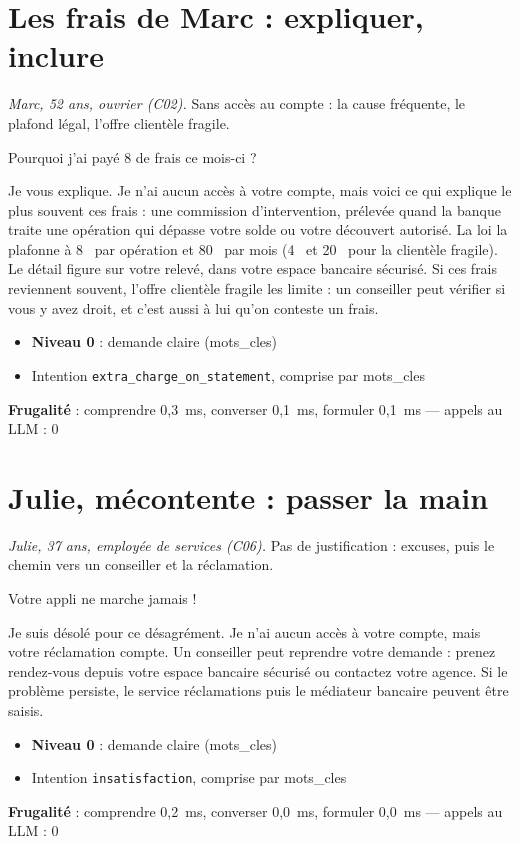 \documentclass[11pt,a4paper]{article}
\newcommand{\frugal}[1]{{\scriptsize\color{darkgray}\textbf{Frugalité} : #1}\par\medskip}
\begin{document}
\section{Les frais de Marc : expliquer, inclure}
\textit{Marc, 52 ans, ouvrier (C02).} Sans accès au compte : la cause fréquente, le plafond légal, l'offre clientèle fragile.

\begin{client}Pourquoi j'ai payé 8 \texteuro{} de frais ce mois-ci ?\end{client}
\begin{assistant}Je vous explique. Je n'ai aucun accès à votre compte, mais voici ce qui explique le plus souvent ces frais : une commission d'intervention, prélevée quand la banque traite une opération qui dépasse votre solde ou votre découvert autorisé. La loi la plafonne à 8~\texteuro{} par opération et 80~\texteuro{} par mois (4~\texteuro{} et 20~\texteuro{} pour la clientèle fragile). Le détail figure sur votre relevé, dans votre espace bancaire sécurisé. Si ces frais reviennent souvent, l'offre clientèle fragile les limite : un conseiller peut vérifier si vous y avez droit, et c'est aussi à lui qu'on conteste un frais.\end{assistant}
\begin{pourquoi}
\begin{itemize}
\item \textbf{Niveau 0} : demande claire (mots\_cles)
\item Intention \texttt{extra\_charge\_on\_statement}, comprise par mots\_cles
\end{itemize}
\end{pourquoi}
\frugal{comprendre 0,3~ms, converser 0,1~ms, formuler 0,1~ms --- appels au LLM : 0}

\section{Julie, mécontente : passer la main}
\textit{Julie, 37 ans, employée de services (C06).} Pas de justification : excuses, puis le chemin vers un conseiller et la réclamation.

\begin{client}Votre appli ne marche jamais !\end{client}
\begin{assistant}Je suis désolé pour ce désagrément. Je n'ai aucun accès à votre compte, mais votre réclamation compte. Un conseiller peut reprendre votre demande : prenez rendez-vous depuis votre espace bancaire sécurisé ou contactez votre agence. Si le problème persiste, le service réclamations puis le médiateur bancaire peuvent être saisis.\end{assistant}
\begin{pourquoi}
\begin{itemize}
\item \textbf{Niveau 0} : demande claire (mots\_cles)
\item Intention \texttt{insatisfaction}, comprise par mots\_cles
\end{itemize}
\end{pourquoi}
\frugal{comprendre 0,2~ms, converser 0,0~ms, formuler 0,0~ms --- appels au LLM : 0}
\end{document}
